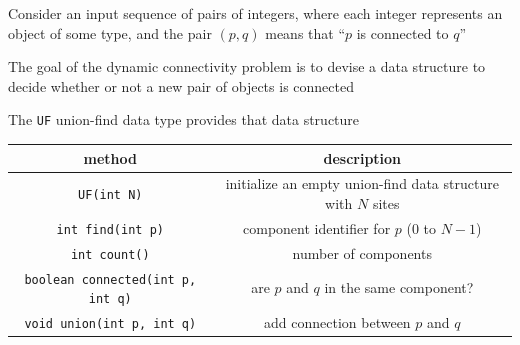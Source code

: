 \documentclass[8pt,a4paper,compress]{beamer}
\begin{document}
\begin{frame}[fragile]
\begin{minipage}{250pt}
\pause

Consider an input sequence of pairs of integers, where each integer represents an object of some type, and the pair $(p, q)$ means that ``$p$ is connected to $q$''

\pause
\bigskip

The goal of the dynamic connectivity problem is to devise a data structure to decide whether or not a new pair of objects is connected 

\pause
\bigskip

The \lstinline{UF} union-find data type provides that data structure

\begin{center}
\begin{tabular}{cc}
method & description \\ \hline
\lstinline$UF(int N)$ & \makecell{initialize an empty union-find \\ data structure with $N$ sites} \\
\lstinline$int find(int p)$ & \makecell{component identifier \\ for $p$ (0 to $N-1$)} \\
\lstinline$int count()$ & number of components \\
\lstinline$boolean connected(int p, int q)$ & \makecell{are $p$ and $q$ in the \\ same component?} \\
\lstinline$void union(int p, int q)$ & add connection between $p$ and $q$
\end{tabular} 
\end{center} 
\end{minipage}%
\begin{minipage}{60pt}

\end{minipage}
\end{frame}
\end{document}
